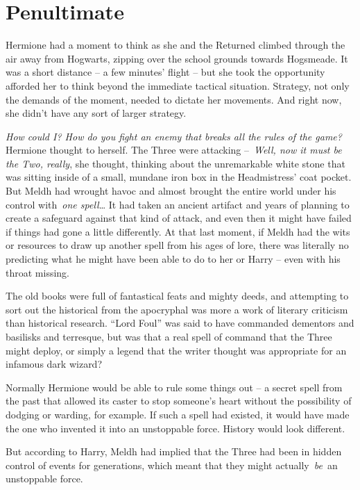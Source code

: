 \hypertarget{penultimate}{%
\chapter{Penultimate}\label{penultimate}}

Hermione had a moment to think as she and the Returned climbed through
the air away from Hogwarts, zipping over the school grounds towards
Hogsmeade. It was a short distance -- a few minutes' flight -- but she
took the opportunity afforded her to think beyond the immediate tactical
situation. Strategy, not only the demands of the moment, needed to
dictate her movements. And right now, she didn't have any sort of larger
strategy.

\emph{How could I? How do you fight an enemy that breaks all the rules
of the game?} Hermione thought to herself. The Three were attacking
--~\emph{Well, now it must be the Two, really}, she thought, thinking
about the unremarkable white stone that was sitting inside of a small,
mundane iron box in the Headmistress' coat pocket. But Meldh had wrought
havoc and almost brought the entire world under his control
with~\emph{one spell}\ldots{} It had taken an ancient artifact and years
of planning to create a safeguard against that kind of attack, and even
then it might have failed if things had gone a little differently. At
that last moment, if Meldh had the wits or resources to draw up another
spell from his ages of lore, there was literally no predicting what he
might have been able to do to her or Harry -- even with his throat
missing.

The old books were full of fantastical feats and mighty deeds, and
attempting to sort out the historical from the apocryphal was more a
work of literary criticism than historical research. ``Lord Foul'' was
said to have commanded dementors and basilisks and terresque, but was
that a real spell of command that the Three might deploy, or simply a
legend that the writer thought was appropriate for an infamous dark
wizard?

Normally Hermione would be able to rule some things out -- a secret
spell from the past that allowed its caster to stop someone's heart
without the possibility of dodging or warding, for example. If such a
spell had existed, it would have made the one who invented it into an
unstoppable force. History would look different.

But according to Harry, Meldh had implied that the Three had been in
hidden control of events for generations, which meant that they might
actually~\emph{be}~an unstoppable force.


